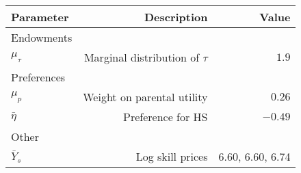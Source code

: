 \begin{tabular}{lrr}
\hline
Parameter & Description  & Value  \\ 
\hline
Endowments &   &   \\ 
$\mu_{\tau}$ & Marginal distribution of $\tau$  & $1.9$  \\ 
Preferences &   &   \\ 
$\mu_{p}$ & Weight on parental utility  & $0.26$  \\ 
$\bar{\eta}$ & Preference for HS  & $-0.49$  \\ 
Other &   &   \\ 
$\bar{Y}_{s}$ & Log skill prices  & 6.60, 6.60, 6.74  \\ 
\hline
\end{tabular}%

